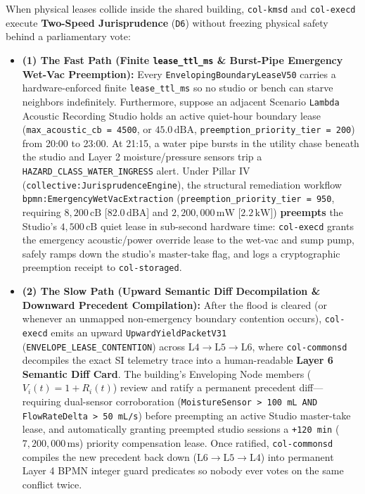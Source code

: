 When physical leases collide inside the shared building, \texttt{col-kmsd} and \texttt{col-execd} execute
\textbf{Two-Speed Jurisprudence} (\texttt{D6}) without freezing physical safety behind a parliamentary vote:
\begin{itemize}
    \item \textbf{(1) The Fast Path (Finite \texttt{lease\_ttl\_ms} \& Burst-Pipe Emergency Wet-Vac Preemption):}
    Every \texttt{EnvelopingBoundaryLeaseV50} carries a hardware-enforced finite \texttt{lease\_ttl\_ms}
    so no studio or bench can starve neighbors indefinitely. Furthermore, suppose an adjacent Scenario
    \texttt{Lambda} Acoustic Recording Studio holds an active quiet-hour boundary lease
    (\texttt{max\_acoustic\_cb = 4500}, or $45.0\,\mathrm{dBA}$, \texttt{preemption\_priority\_tier = 200})
    from 20:00 to 23:00. At 21:15, a water pipe bursts in the utility chase beneath the studio and Layer 2
    moisture/pressure sensors trip a \texttt{HAZARD\_CLASS\_WATER\_INGRESS} alert. Under Pillar IV
    (\texttt{collective:JurisprudenceEngine}), the structural remediation workflow
    \texttt{bpmn:EmergencyWetVacExtraction} (\texttt{preemption\_priority\_tier = 950}, requiring
    $8{,}200\,\mathrm{cB}$ [$82.0\,\mathrm{dBA}$] and $2{,}200{,}000\,\mathrm{mW}$ [$2.2\,\mathrm{kW}$])
    \textbf{preempts} the Studio's $4{,}500\,\mathrm{cB}$ quiet lease in sub-second hardware time:
    \texttt{col-execd} grants the emergency acoustic/power override lease to the wet-vac and sump pump,
    safely ramps down the studio's master-take flag, and logs a cryptographic preemption receipt to
    \texttt{col-storaged}.
    \item \textbf{(2) The Slow Path (Upward Semantic Diff Decompilation \& Downward Precedent Compilation):}
    After the flood is cleared (or whenever an unmapped non-emergency boundary contention occurs),
    \texttt{col-execd} emits an upward \texttt{UpwardYieldPacketV31} (\texttt{ENVELOPE\_LEASE\_CONTENTION})
    across $\mathrm{L4} \to \mathrm{L5} \to \mathrm{L6}$, where \texttt{col-commonsd} decompiles the exact SI
    telemetry trace into a human-readable \textbf{Layer 6 Semantic Diff Card}. The building's Enveloping Node
    members ($V_i(t) = 1 + R_i(t)$) review and ratify a permanent precedent diff---requiring dual-sensor
    corroboration (\texttt{MoistureSensor > 100 mL AND FlowRateDelta > 50 mL/s}) before preempting an
    active Studio master-take lease, and automatically granting preempted studio sessions a
    \texttt{+120 min} ($7{,}200{,}000\,\mathrm{ms}$) priority compensation lease. Once ratified,
    \texttt{col-commonsd} compiles the new precedent back down ($\mathrm{L6} \to \mathrm{L5} \to \mathrm{L4}$)
    into permanent Layer 4 BPMN integer guard predicates so nobody ever votes on the same conflict twice.
\end{itemize}

